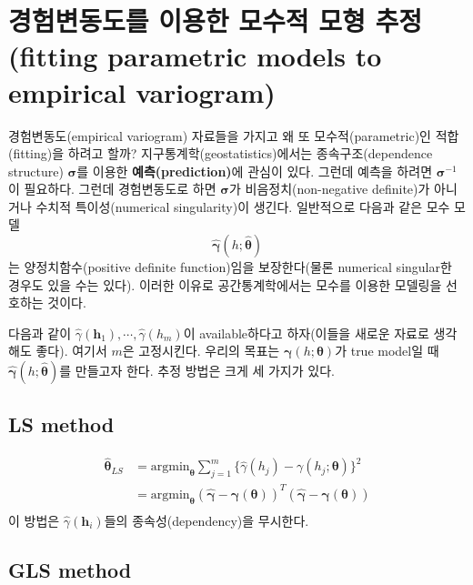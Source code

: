 \documentclass[b5paper,]{book}
\theoremstyle{definition}
\theoremstyle{definition}
\theoremstyle{definition}
\theoremstyle{remark}
\begin{document}
\section{경험변동도를 이용한 모수적 모형 추정(fitting parametric models
to empirical
variogram)}\label{----fitting-parametric-models-to-empirical-variogram}

경험변동도(empirical variogram) 자료들을 가지고 왜 또
모수적(parametric)인 적합(fitting)을 하려고 할까?
지구통계학(geostatistics)에서는 종속구조(dependence structure)
\(\boldsymbol{\sigma}\)를 이용한 \textbf{예측(prediction)}에 관심이
있다. 그런데 예측을 하려면 \(\boldsymbol{\sigma}^{-1}\)이 필요하다.
그런데 경험변동도로 하면 \(\boldsymbol{\sigma}\)가 비음정치(non-negative
definite)가 아니거나 수치적 특이성(numerical singularity)이 생긴다.
일반적으로 다음과 같은 모수 모델
\[\hat{\boldsymbol{\gamma}}(h;\hat{\boldsymbol{\theta}})\] 는
양정치함수(positive definite function)임을 보장한다(물론 numerical
singular한 경우도 있을 수는 있다). 이러한 이유로 공간통계학에서는 모수를
이용한 모델링을 선호하는 것이다.

다음과 같이
\(\hat{\gamma}(\mathbf{h}_{1}), \cdots , \hat{\gamma}(h_{m})\)이
available하다고 하자(이들을 새로운 자료로 생각해도 좋다). 여기서 \(m\)은
고정시킨다. 우리의 목표는
\(\boldsymbol{\gamma}(h;\boldsymbol{\theta})\)가 true model일 때
\(\hat{\boldsymbol{\gamma}}(h;\hat{\boldsymbol{\theta}})\)를 만들고자
한다. 추정 방법은 크게 세 가지가 있다.

\subsection{LS method}\label{ls-method}

\[
\begin{aligned}
\hat{\boldsymbol{\theta}}_{LS}&=\text{argmin}_{\boldsymbol{\theta}}\sum_{j=1}^{m}\{ \hat{\gamma}(h_{j})-\gamma(h_{j};\boldsymbol{\theta})\}^{2}\\
&=\text{argmin}_{\boldsymbol{\theta}}(\hat{\boldsymbol{\gamma}}-\boldsymbol{\gamma}(\boldsymbol{\theta}))^{T}(\hat{\boldsymbol{\gamma}}-\boldsymbol{\gamma}(\boldsymbol{\theta}))\\
\end{aligned}
\] 이 방법은 \(\hat{\gamma}(\mathbf{h}_{i})\)들의 종속성(dependency)을
무시한다.

\subsection{GLS method}\label{gls-method}
\end{document}
